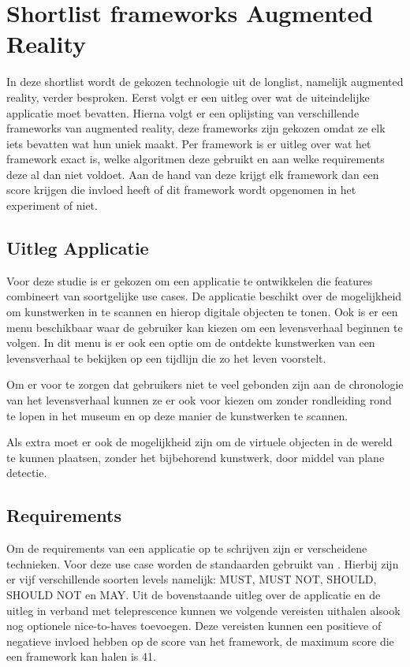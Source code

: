 \chapter{Shortlist frameworks Augmented Reality}
\label{ch:shortlist}

In deze shortlist wordt de gekozen technologie uit de longlist, namelijk augmented reality, verder besproken.
Eerst volgt er een uitleg over wat de uiteindelijke applicatie moet bevatten.
Hierna volgt er een oplijsting van verschillende frameworks van augmented reality, deze frameworks zijn gekozen omdat ze elk iets bevatten wat hun uniek maakt. Per framework is er uitleg over wat het framework exact is, welke algoritmen deze gebruikt en aan welke requirements deze al dan niet voldoet. Aan de hand van deze krijgt elk framework dan een score krijgen die invloed heeft of dit framework wordt opgenomen in het experiment of niet.

\section{Uitleg Applicatie}
Voor deze studie is er gekozen om een applicatie te ontwikkelen die features combineert van soortgelijke use cases. De applicatie beschikt over de mogelijkheid om kunstwerken in te scannen en hierop digitale objecten te tonen. Ook is er een menu beschikbaar waar de gebruiker kan kiezen om een levensverhaal beginnen te volgen. In dit menu is er ook een optie om de ontdekte kunstwerken van een levensverhaal te bekijken op een tijdlijn die zo het leven voorstelt.

Om er voor te zorgen dat gebruikers niet te veel gebonden zijn aan de chronologie van het levensverhaal kunnen ze er ook voor kiezen om zonder rondleiding rond te lopen in het museum en op deze manier de kunstwerken te scannen.

Als extra moet er ook de mogelijkheid zijn om de virtuele objecten in de wereld te kunnen plaatsen, zonder het bijbehorend kunstwerk, door middel van plane detectie.

\section{Requirements}
Om de requirements van een applicatie op te schrijven zijn er verscheidene technieken. Voor deze use case worden de standaarden gebruikt van \textcite{Bradner1997}. Hierbij zijn er vijf verschillende soorten levels namelijk: MUST, MUST NOT, SHOULD, SHOULD NOT en MAY. Uit de bovenstaande uitleg over de applicatie en de uitleg in verband met teleprescence kunnen we volgende vereisten uithalen alsook nog optionele nice-to-haves toevoegen. Deze vereisten kunnen een positieve of negatieve invloed hebben op de score van het framework, de maximum score die een framework kan halen is 41.

